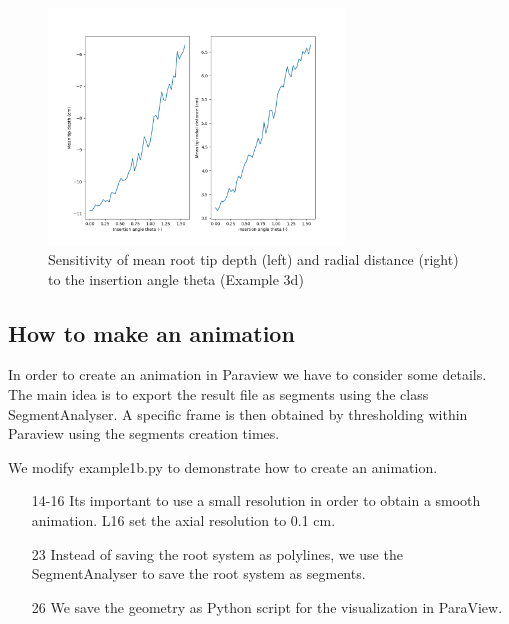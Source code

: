 \documentclass[a4paper]{article}
\begin{document}
\begin{figure}
\centering
\includegraphics[width=0.7\textwidth]{example_3d.png}
\caption{Sensitivity of mean root tip depth (left) and radial distance (right) to the insertion angle theta (Example 3d) } \label{fig:sa}
\end{figure}

\subsection{How to make an animation}

In order to create an animation in Paraview we have to consider some details. 
The main idea is to export the result file as segments using the class SegmentAnalyser. 
A specific frame is then obtained by thresholding within Paraview using the segments creation times. 

We modify example1b.py to demonstrate how to create an animation.

 

\begin{itemize}

\item[14-16] Its important to use a small resolution in order to obtain a smooth animation. L16 set the axial resolution to 0.1 cm. 

\item[23] Instead of saving the root system as polylines, we use the SegmentAnalyser to save the root system as segments.

\item[26] We save the geometry as Python script for the visualization in ParaView.

\end{itemize}
\end{document}
